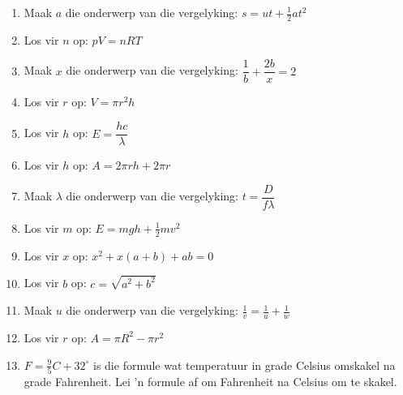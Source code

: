 \begin{exercises}{}
{
\begin{enumerate}[itemsep=4pt, label=\textbf{\arabic*}. ] 
\item Maak $a$ die onderwerp van die vergelyking: $s=ut+\frac{1}{2}at^{2}$
\item Los vir $n$ op: $pV=nRT$  
\item Maak $x$ die onderwerp van die vergelyking: $\dfrac{1}{b}+\dfrac{2b}{x}=2$
\item Los vir $r$ op: $V = \pi r^{2} h$ 
\item Los vir $h$ op: $E=\dfrac{hc}{\lambda}$ 
\item Los vir $h$ op: $A=2\pi rh + 2 \pi r$ 
\item Maak $\lambda$ die onderwerp van die vergelyking: $t=\dfrac{D}{f \lambda}$
\item Los vir $m$ op: $E=mgh + \frac{1}{2}mv^{2}$ 
\item Los vir $x$ op: $x^2+x(a+b)+ab=0$ 
\item Los vir $b$ op: $c=\sqrt{a^2+b^2}$ 
\item Maak $u$ die onderwerp van die vergelyking: $\frac{1}{v}=\frac{1}{u}+\frac{1}{w}$
\item Los vir $r$ op: $A=\pi R^2 -\pi r^2$  
\item $F=\frac{9}{5}C + 32^\circ$ is die formule wat temperatuur in grade Celsius omskakel na grade Fahrenheit. Lei 'n formule af om Fahrenheit na Celsius om te skakel.
\end{enumerate}
}
\end{exercises}


